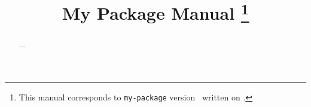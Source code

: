 \documentclass{ltxdoc}
\begin{document}
    \title{My Package Manual%
        \thanks{%
            This manual corresponds to \texttt{my-package}
            version \gitversion\ written on \gitdate.}}%
    \maketitle
    \begin{abstract}
        ...
    \end{abstract}
    \begin{multicols}{2}
        \tableofcontents \columnbreak \printindex
    \end{multicols}
\end{document}
